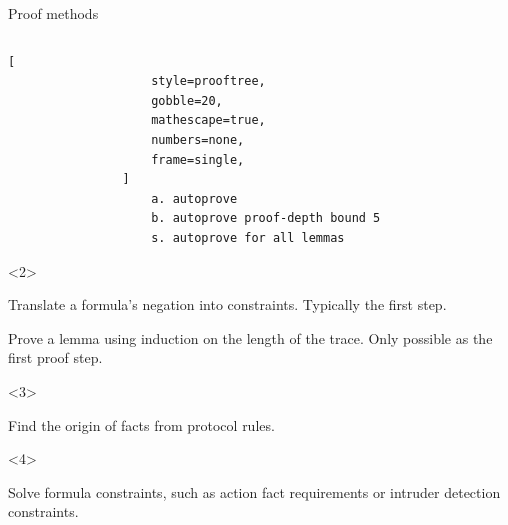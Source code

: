 \documentclass[11pt,aspectratio=169]{beamer}
\begin{document}
\begin{frame}[fragile]{Proof methods}
\begin{columns}[T]
\begin{column}{0.45\textwidth}
\begin{onlyenv}
\begin{lstlisting}[
                    style=prooftree,
                    gobble=20,
                    mathescape=true,
                    numbers=none,
                    frame=single,
                ]
                    a. autoprove
                    b. autoprove proof-depth bound 5
                    s. autoprove for all lemmas
                \end{lstlisting}
            \end{onlyenv}
            \begin{onlyenv}<2>
                \begin{tcolorbox}[
                    title = {\fontfamily{pcr}\fontseries{b}\selectfont simplify},
                    left = 1mm,
                    top = 1mm,
                    right = 1mm,
                    bottom = 1mm,
                ]
                    Translate a formula's negation into constraints. Typically 
                    the first step.
                \end{tcolorbox}
                \begin{tcolorbox}[
                    title = {\fontfamily{pcr}\fontseries{b}\selectfont induction},
                    left = 1mm,
                    top = 1mm,
                    right = 1mm,
                    bottom = 1mm,
                ]
                    Prove a lemma using induction on the length of the trace. 
                    Only possible as the first proof step.
                \end{tcolorbox}
            \end{onlyenv}
            \begin{onlyenv}<3>
                \begin{tcolorbox}[
                    title = {\small Premise constraints\hfill(line 5)},
                    left = 1mm,
                    top = 1mm,
                    right = 1mm,
                    bottom = 1mm,
                ]
                    Find the origin of facts from protocol rules.
                \end{tcolorbox}
            \end{onlyenv}
            \begin{onlyenv}<4>
                \begin{tcolorbox}[
                    title = {\small Action constraints\hfill(line 7)},
                    left = 1mm,
                    top = 1mm,
                    right = 1mm,
                    bottom = 1mm,
                ]
                    Solve formula constraints, such as action fact requirements 
                    or intruder detection constraints.
                \end{tcolorbox}
            \end{onlyenv}

\end{column}
\end{columns}
\end{frame}
\end{document}

